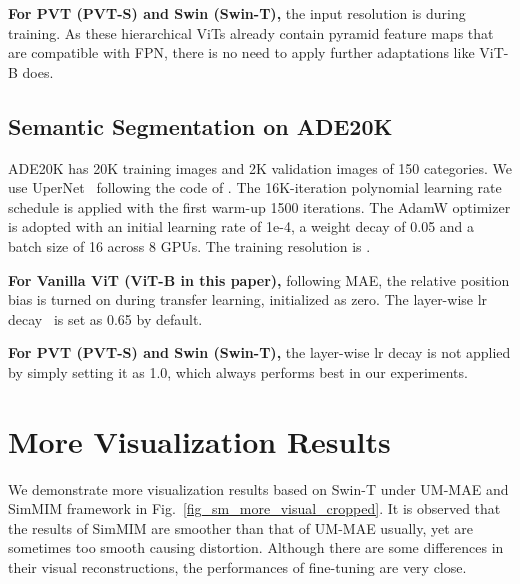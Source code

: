 \documentclass{article}
\begin{document}
\textbf{For PVT (PVT-S) and Swin (Swin-T),} the input resolution is  during training. As these hierarchical ViTs already contain pyramid feature maps that are compatible with FPN, there is no need to apply further adaptations like ViT-B does. 




\subsection{Semantic Segmentation on ADE20K}
ADE20K has 20K training images and 2K validation images of 150 categories. We use UperNet~\cite{xiao2018unified} following the code of \cite{bao2021beit}. The 16K-iteration polynomial learning rate schedule is applied with the first warm-up 1500 iterations. The AdamW optimizer is adopted with an initial learning rate of 1e-4, a weight decay of 0.05 and a batch size of 16 across 8 GPUs. The training resolution is .

\textbf{For Vanilla ViT (ViT-B in this paper),} following MAE, the relative position bias is turned on during transfer learning, initialized as zero. The layer-wise lr decay~\cite{clark2020electra,bao2021beit} is set as 0.65 by default.

\textbf{For PVT (PVT-S) and Swin (Swin-T),} the layer-wise lr decay is not applied by simply setting it as 1.0, which always performs best in our experiments. 






\section{More Visualization Results}
We demonstrate more visualization results based on Swin-T under UM-MAE and SimMIM framework in Fig.~\ref{fig_sm_more_visual_cropped}. It is observed that the results of SimMIM are smoother than that of UM-MAE usually, yet are sometimes too smooth causing distortion. Although there are some differences in their visual reconstructions, the performances of fine-tuning are very close.
\end{document}
